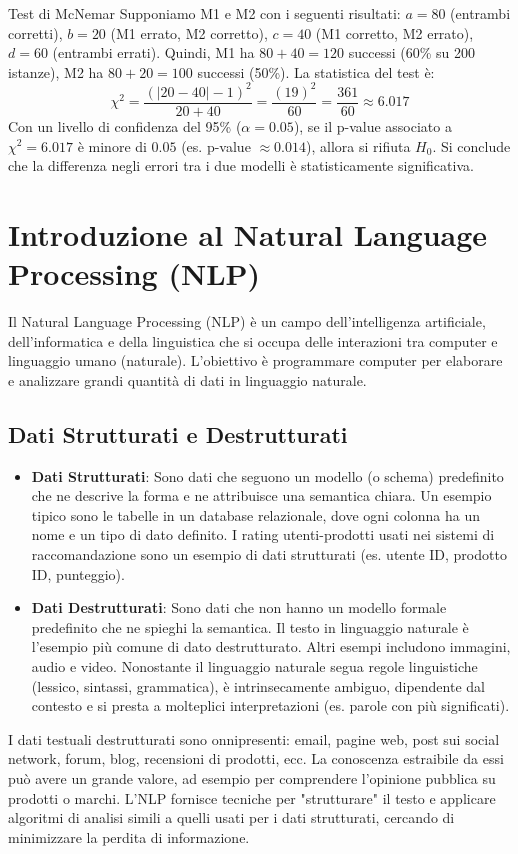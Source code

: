 \documentclass{article}
\begin{document}
\begin{examplebox}{Test di McNemar}
    Supponiamo M1 e M2 con i seguenti risultati: $a=80$ (entrambi corretti), $b=20$ (M1 errato, M2 corretto), $c=40$ (M1 corretto, M2 errato), $d=60$ (entrambi errati).
    Quindi, M1 ha $80+40=120$ successi (60\% su 200 istanze), M2 ha $80+20=100$ successi (50\%).
    La statistica del test è:
    $$ \chi^2 = \frac{(|20-40|-1)^2}{20+40} = \frac{(19)^2}{60} = \frac{361}{60} \approx 6.017 $$
    Con un livello di confidenza del 95\% ($\alpha=0.05$), se il p-value associato a $\chi^2=6.017$ è minore di $0.05$ (es. p-value $\approx 0.014$), allora si rifiuta $H_0$. Si conclude che la differenza negli errori tra i due modelli è statisticamente significativa.
\end{examplebox}


\section{Introduzione al Natural Language Processing (NLP)}

Il Natural Language Processing (NLP) è un campo dell'intelligenza artificiale, dell'informatica e della linguistica che si occupa delle interazioni tra computer e linguaggio umano (naturale). L'obiettivo è programmare computer per elaborare e analizzare grandi quantità di dati in linguaggio naturale.

\subsection{Dati Strutturati e Destrutturati}
\begin{itemize}
    \item \textbf{Dati Strutturati}: Sono dati che seguono un modello (o schema) predefinito che ne descrive la forma e ne attribuisce una semantica chiara. Un esempio tipico sono le tabelle in un database relazionale, dove ogni colonna ha un nome e un tipo di dato definito. I rating utenti-prodotti usati nei sistemi di raccomandazione sono un esempio di dati strutturati (es. utente ID, prodotto ID, punteggio).
    \item \textbf{Dati Destrutturati}: Sono dati che non hanno un modello formale predefinito che ne spieghi la semantica. Il testo in linguaggio naturale è l'esempio più comune di dato destrutturato. Altri esempi includono immagini, audio e video. Nonostante il linguaggio naturale segua regole linguistiche (lessico, sintassi, grammatica), è intrinsecamente ambiguo, dipendente dal contesto e si presta a molteplici interpretazioni (es. parole con più significati).
\end{itemize}
I dati testuali destrutturati sono onnipresenti: email, pagine web, post sui social network, forum, blog, recensioni di prodotti, ecc. La conoscenza estraibile da essi può avere un grande valore, ad esempio per comprendere l'opinione pubblica su prodotti o marchi. L'NLP fornisce tecniche per "strutturare" il testo e applicare algoritmi di analisi simili a quelli usati per i dati strutturati, cercando di minimizzare la perdita di informazione.
\end{document}
